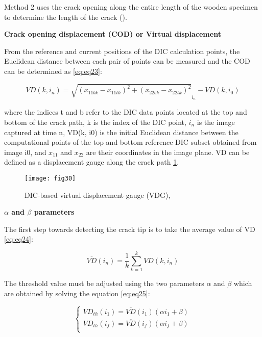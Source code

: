 Method 2 uses the crack opening along the entire length of the wooden specimen to determine the length of the crack (\cite{FilhoJ2022}). 

\textbf{Crack opening displacement (COD) or Virtual displacement}

From the reference and current positions of the DIC calculation points, the Euclidean distance between each pair of points can be measured and the COD can be determined as \ref{eq:eq23}:

\begin{equation}
	VD(k,i_n)=\sqrt{(x_{11bk}-x_{11tk})^2 + (x_{22bk}-x_{22tk})^2}_{i_n} - VD(k,i_0)
	\label{eq:eq23}
\end{equation}

where the indices t and b refer to the DIC data points located at the top and bottom of the crack path, k is the index of the DIC point, $i_n$ is the image captured at time n, VD(k, i0) is the initial Euclidean distance between the computational points of the top and bottom reference DIC subset obtained from image i0, and $x_{11}$ and $x_{22}$ are their coordinates in the image plane. VD can be defined as a displacement gauge along the crack path \ref{fig:fig30}.

\begin{figure}[htp]
	\centering
	\texttt{[image: fig30]}
	\caption{DIC-based virtual displacement gauge (VDG), \cite{FilhoJ2022}}
	\label{fig:fig30}
\end{figure}

\textbf{$\alpha$ and $\beta$ parameters}

The first step towards detecting the crack tip is to take the average value of VD \ref{eq:eq24}:

\begin{equation}
	\overline{VD}(i_n)=\frac{1}{k} \sum_{k=1}^{k}VD(k,i_n)
	\label{eq:eq24}
\end{equation}

The threshold value must be adjusted using the two parameters $\alpha$ and $\beta$ which are obtained by solving the equation \ref{eq:eq25}:

\begin{equation}
	\begin{cases}
		VD_{th}(i_1)=\overline{VD}(i_1)(\alpha i_1 +\beta)\\
		VD_{th}(i_f)=\overline{VD}(i_f)(\alpha i_f +\beta)\\ 
	\end{cases}
\label{eq:eq25}
\end{equation}

